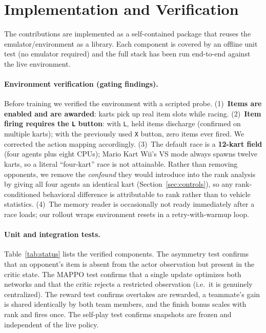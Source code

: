 \documentclass{article}
\begin{document}
\section{Implementation and Verification}
\label{sec:verify}

The contributions are implemented as a self-contained package that reuses the
emulator/environment as a library. Each component is covered by an offline unit
test (no emulator required) and the full stack has been run end-to-end against
the live environment.

\paragraph{Environment verification (gating findings).} Before training we
verified the environment with a scripted probe.
(1)~\textbf{Items are enabled and are awarded}: karts pick up real item slots
while racing. (2)~\textbf{Item firing requires the \texttt{L} button}: with
\texttt{L}, held items discharge (confirmed on multiple karts); with the
previously used \texttt{X} button, zero items ever fired. We corrected the action
mapping accordingly. (3)~The default race is a \textbf{12-kart field} (four
agents plus eight CPUs); Mario Kart Wii's VS mode always spawns twelve karts, so
a literal ``four-kart'' race is not attainable. Rather than removing opponents, we
remove the \emph{confound} they would introduce into the rank analysis by giving
all four agents an identical kart (Section~\ref{sec:controls}), so any
rank-conditioned behavioral difference is attributable to rank rather than to
vehicle statistics. (4)~The memory reader is occasionally not ready immediately after a
race loads; our rollout wraps environment resets in a retry-with-warmup loop.

\paragraph{Unit and integration tests.} Table~\ref{tab:status} lists the verified
components. The asymmetry test confirms that an opponent's item is absent from
the actor observation but present in the critic state. The MAPPO test confirms
that a single update optimizes both networks and that the critic rejects a
restricted observation (i.e.\ it is genuinely centralized). The reward test
confirms overtakes are rewarded, a teammate's gain is shared identically by both
team members, and the finish bonus scales with rank and fires once. The
self-play test confirms snapshots are frozen and independent of the live policy.
\end{document}
